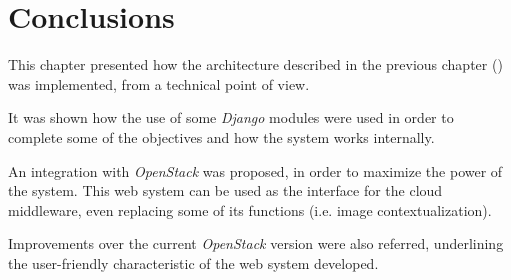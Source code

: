 \section{Conclusions}

This chapter presented how the architecture described in the previous chapter () was implemented, from a technical point of view. 

It was shown how the use of some \textit{Django} modules were used in order to complete some of the objectives and how the system works internally.

An integration with \textit{OpenStack} was proposed, in order to maximize the power of the system. This web system can be used as the interface for the cloud middleware, even replacing some of its functions (i.e. image contextualization).

Improvements over the current \textit{OpenStack} version were also referred, underlining the user-friendly characteristic of the web system developed.
